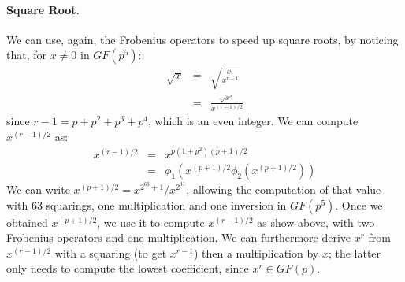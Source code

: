 \documentclass{llncs}
\newcommand{\GF}{GF}
\begin{document}
\paragraph{Square Root.} We can use, again, the Frobenius operators to
speed up square roots, by noticing that, for $x\neq 0$ in $\GF(p^5)$:
\begin{eqnarray*}
    \sqrt{x} &=& \sqrt{\frac{x^r}{x^{r-1}}} \\
             &=& \frac{\sqrt{x^r}}{x^{(r-1)/2}}
\end{eqnarray*}
since $r - 1 = p + p^2 + p^3 + p^4$, which is an even integer. We can
compute $x^{(r-1)/2}$ as:
\begin{eqnarray*}
    x^{(r-1)/2} &=& x^{p(1 + p^2)(p + 1)/2} \\
                &=& \phi_1( x^{(p+1)/2} \phi_2( x^{(p+1)/2} ))
\end{eqnarray*}
We can write $x^{(p+1)/2} = x^{2^{63} + 1} / x^{2^{31}}$, allowing the
computation of that value with 63 squarings, one multiplication and one
inversion in $\GF(p^5)$. Once we obtained $x^{(p+1)/2}$, we use it to
compute $x^{(r-1)/2}$ as show above, with two Frobenius operators and
one multiplication. We can furthermore derive $x^r$ from $x^{(r-1)/2}$
with a squaring (to get $x^{r-1}$) then a multiplication by $x$; the
latter only needs to compute the lowest coefficient, since $x^r \in
\GF(p)$.
\end{document}
